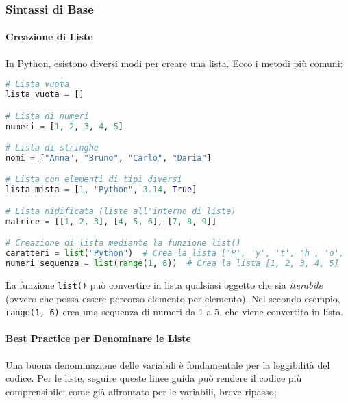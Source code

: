 

\subsubsection{Sintassi di Base}

\paragraph{Creazione di Liste}

In Python, esistono diversi modi per creare una lista. Ecco i metodi più comuni:

\begin{lstlisting}[language=Python]
# Lista vuota
lista_vuota = []

# Lista di numeri
numeri = [1, 2, 3, 4, 5]

# Lista di stringhe
nomi = ["Anna", "Bruno", "Carlo", "Daria"]

# Lista con elementi di tipi diversi
lista_mista = [1, "Python", 3.14, True]

# Lista nidificata (liste all'interno di liste)
matrice = [[1, 2, 3], [4, 5, 6], [7, 8, 9]]

# Creazione di lista mediante la funzione list()
caratteri = list("Python")  # Crea la lista ['P', 'y', 't', 'h', 'o', 'n']
numeri_sequenza = list(range(1, 6))  # Crea la lista [1, 2, 3, 4, 5]
\end{lstlisting}

\begin{nota}
La funzione \texttt{list()} può convertire in lista qualsiasi oggetto che sia \textit{iterabile} (ovvero che possa essere percorso elemento per elemento). Nel secondo esempio, \texttt{range(1, 6)} crea una sequenza di numeri da 1 a 5, che viene convertita in lista.
\end{nota}

\paragraph{Best Practice per Denominare le Liste}

Una buona denominazione delle variabili è fondamentale per la leggibilità del codice. Per le liste, seguire queste linee guida può rendere il codice più comprensibile:
come già affrontato per le variabili, breve ripasso;\textit{}

